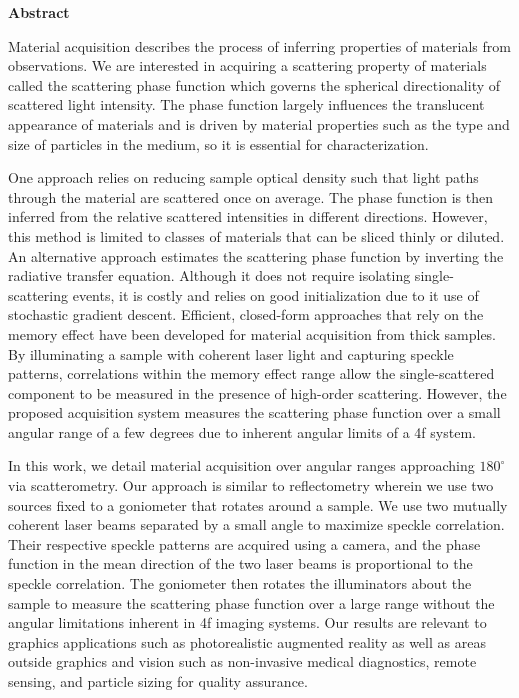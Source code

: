 \thispagestyle{plain}

\begin{flushleft}
\textbf{\Huge Abstract}
\vspace{8mm}
\end{flushleft}

Material acquisition describes the process of inferring properties of materials from observations. We are interested in acquiring a scattering property of materials called the scattering phase function which governs the spherical directionality of scattered light intensity. The phase function largely influences the translucent appearance of materials and is driven by material properties such as the type and size of particles in the medium, so it is essential for characterization.

One approach relies on reducing sample optical density such that light paths through the material are scattered once on average. The phase function is then inferred from the relative scattered intensities in different directions. However, this method is limited to classes of materials that can be sliced thinly or diluted. An alternative approach estimates the scattering phase function by inverting the radiative transfer equation. Although it does not require isolating single-scattering events, it is costly and relies on good initialization due to it use of stochastic gradient descent. Efficient, closed-form approaches that rely on the memory effect have been developed for material acquisition from thick samples. By illuminating a sample with coherent laser light and capturing speckle patterns, correlations within the memory effect range allow the single-scattered component to be measured in the presence of high-order scattering. However, the proposed acquisition system measures the scattering phase function over a small angular range of a few degrees due to inherent angular limits of a 4f system.

In this work, we detail material acquisition over angular ranges approaching $180^\circ$ via scatterometry. Our approach is similar to reflectometry wherein we use two sources fixed to a goniometer that rotates around a sample. We use two mutually coherent laser beams separated by a small angle to maximize speckle correlation. Their respective speckle patterns are acquired using a camera, and the phase function in the mean direction of the two laser beams is proportional to the speckle correlation. The goniometer then rotates the illuminators about the sample to measure the scattering phase function over a large range without the angular limitations inherent in 4f imaging systems. Our results are relevant to graphics applications such as photorealistic augmented reality as well as areas outside graphics and vision such as non-invasive medical diagnostics, remote sensing, and particle sizing for quality assurance.